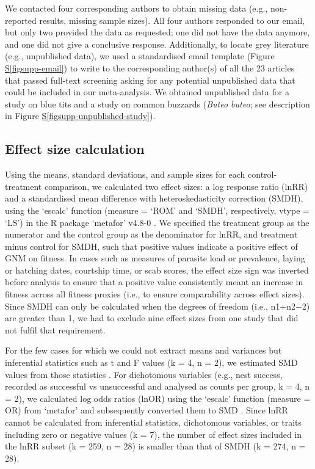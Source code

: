 \documentclass[
  number,
  review,
  onecolumn]{elsarticle}
\newcommand*\quartofigsuppref[1]{Figure \hyperref[#1]{S\ref{#1}}}
\begin{document}
We contacted four corresponding authors to obtain missing data (e.g.,
non-reported results, missing sample sizes). All four authors responded
to our email, but only two provided the data as requested; one did not
have the data anymore, and one did not give a conclusive response.
Additionally, to locate grey literature (e.g., unpublished data), we
used a standardised email template (\quartofigsuppref{figsupp-email}) to
write to the corresponding author(s) of all the 23 articles that passed
full-text screening asking for any potential unpublished data that could
be included in our meta-analysis. We obtained unpublished data for a
study on blue tits and a study on common buzzards (\emph{Buteo buteo};
see description in \quartofigsuppref{figsupp-unpublished-study}).

\subsection{Effect size calculation}\label{effect-size-calculation}

Using the means, standard deviations, and sample sizes for each
control-treatment comparison, we calculated two effect sizes: a log
response ratio (lnRR) and a standardised mean difference with
heteroskedasticity correction (SMDH), using the `escalc' function
(measure = `ROM' and `SMDH', respectively, vtype = `LS') in the R
package `metafor' v4.8-0 \citep{metafor}. We specified the treatment
group as the numerator and the control group as the denominator for
lnRR, and treatment minus control for SMDH, such that positive values
indicate a positive effect of GNM on fitness. In cases such as measures
of parasite load or prevalence, laying or hatching dates, courtship
time, or scab scores, the effect size sign was inverted before analysis
to ensure that a positive value consistently meant an increase in
fitness across all fitness proxies (i.e., to ensure comparability across
effect sizes). Since SMDH can only be calculated when the degrees of
freedom (i.e., n1+n2−2) are greater than 1, we had to exclude nine
effect sizes from one study that did not fulfil that requirement.

For the few cases for which we could not extract means and variances but
inferential statistics such as t and F values (k = 4, n = 2), we
estimated SMD values from those statistics \citep{thehand2019}. For
dichotomous variables (e.g., nest success, recorded as successful vs
unsuccessful and analysed as counts per group, k = 4, n = 2), we
calculated log odds ratios (lnOR) using the `escalc' function (measure =
OR) from `metafor' and subsequently converted them to SMD
\citep{thehand2019}. Since lnRR cannot be calculated from inferential
statistics, dichotomous variables, or traits including zero or negative
values (k = 7), the number of effect sizes included in the lnRR subset
(k = 259, n = 28) is smaller than that of SMDH (k = 274, n = 28).
\end{document}
